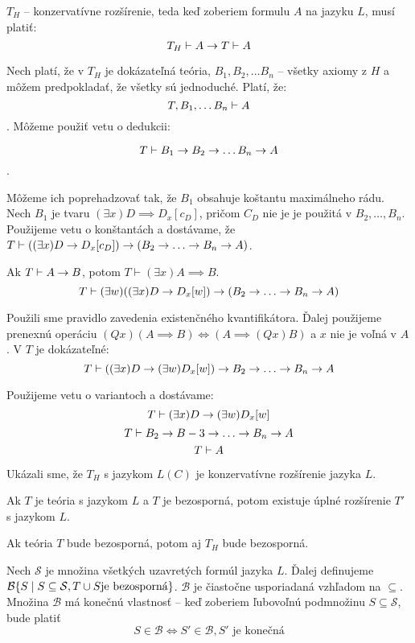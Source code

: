 \begin{dokaz}
$T_H$ -- konzervatívne rozšírenie, teda keď zoberiem formulu $A$ na jazyku $L$,
musí platiť:
$$ T_H \vdash A \rightarrow T \vdash A$$

Nech platí, že v $T_H$ je dokázateľná teória, $B_1, B_2, \ldots B_n$ -- všetky
axiomy z $H$ a môžem predpokladať, že všetky sú jednoduché. Platí, že:
$$ T, B_1, \ldots B_n \vdash A $$. Môžeme použiť vetu o dedukcii:

$$ T \vdash B_1 \rightarrow B_2 \rightarrow \ldots B_n \rightarrow A $$.

Môžeme ich poprehadzovať tak, že $B_1$ obsahuje koštantu maximálneho rádu. Nech
$B_1$ je tvaru $(\exists x) D \implies D_x[c_D]$, pričom $C_D$ nie je je použitá
v $B_2, \ldots, B_n$. Použijeme vetu o konštantách a dostávame, že $T \vdash
((\exists x) D \rightarrow D_x[c_D] ) \rightarrow (B_2 \rightarrow \ldots \rightarrow B_n
\rightarrow A)$.

\par Ak $T \vdash A \rightarrow B$, potom $T\vdash (\exists x) A \implies B$.
$$ T\vdash (\exists w) ((\exists x)D \rightarrow D_x[w]) \rightarrow (B_2 \rightarrow
\ldots \rightarrow B_n \rightarrow A)$$

Použili sme pravidlo zavedenia existenčného kvantifikátora. Ďalej použijeme
prenexnú operáciu $(Qx) (A\implies B) \iff (A\implies (Qx)B)$ a $x$ nie je voľná
v $A$. V $T$ je dokázateľné:
$$T \vdash ((\exists x) D \rightarrow (\exists w)D_x[w]) \rightarrow B_2 \rightarrow \ldots \rightarrow B_n \rightarrow A$$

Použijeme vetu o variantoch a dostávame:
$$ T \vdash ( \exists x ) D \rightarrow (\exists w) D_x[w] $$
$$ T \vdash B_2 \rightarrow B-3 \rightarrow \ldots \rightarrow B_n \rightarrow A $$
$$ T \vdash A$$

Ukázali sme, že $T_H$ s jazykom $L(C)$ je konzervatívne rozšírenie jazyka $L$.
\end{dokaz}

\begin{veta}[Lindenbaum]
    Ak $T$ je teória s jazykom $L$ a $T$ je
    bezosporná, potom existuje úplné rozšírenie $T'$ s jazykom $L$.

    Ak teória $T$ bude bezosporná, potom aj $T_H$ bude bezosporná.
\end{veta}
\begin{dokaz}
    Nech $\mathcal{S}$ je množina všetkých uzavretých formúl jazyka $L$.
    Ďalej definujeme 
        $\mathcal{B} \{ S \mid S \subseteq \mathcal{S}, T \cup S
    \mbox{je bezosporná}\}$.
    $\mathcal{B}$ je čiastočne usporiadaná vzhľadom na $\subseteq$.
    Množina $\mathcal{B}$ má konečnú vlastnosť -- 
    keď zoberiem ľubovoľnú podmnožinu $S \subseteq \mathcal{S}$,
    bude platiť 
    \begin{equation*}
        S \in \mathcal{B} \iff S' \in \mathcal{B}, S' \mbox{ je konečná}
    \end{equation*}
\end{dokaz} 


